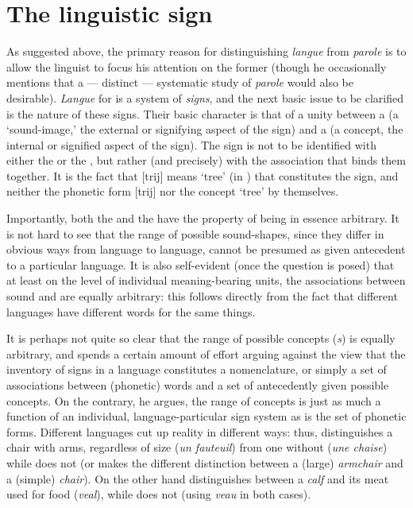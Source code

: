 \section{The linguistic sign}
\label{sec:linguistic-sign}

As suggested above, the primary reason for distinguishing
\emph{langue} from \emph{parole} is to allow the linguist to focus his
attention on the former (though he occasionally mentions that a ---
distinct --- systematic study of \emph{parole} would also be
desirable). \emph{Langue} for {\Saussure} is a system of \emph{signs},
and the next basic issue to be clarified is the nature of these signs.
Their basic character is that of a unity between a \textbf{}
(a `sound-image,' the external or signifying aspect of the sign) and a
\textbf{} (a {concept}, the internal or signified aspect of the
sign).  The sign is not to be identified with either the
\emph{} or the \emph{}, but rather (and precisely)
with the association that binds them together.  It is the fact that
{[trij]} means `tree' (in ) that constitutes the sign, and
neither the phonetic form {[trij]} nor the {concept} `tree' by
themselves.

Importantly, both the \emph{} and the
\emph{} have the property of being in essence arbitrary.
It is not hard to see that the range of possible sound-shapes, since
they differ in obvious ways from language to language, cannot be
presumed as given antecedent to a particular language.  It is also
self-evident (once the question is posed) that at least on the level
of individual meaning-bearing units, the associations between sound
and  are equally arbitrary: this follows directly from the fact
that different languages have different words for the same things.

It is perhaps not quite so clear that the range of possible concepts
(\emph{s}) is equally arbitrary, and {\Saussure} spends a
certain amount of effort arguing against the view that the inventory
of signs in a language constitutes a nomenclature, or simply a set
of associations between (phonetic) words and a set of antecedently
given possible concepts. On the contrary, he argues, the range of
concepts is just as much a function of an individual,
language-particular sign system as is the set of phonetic forms.
Different languages cut up reality in different ways: thus, 
distinguishes a chair with arms, regardless of size (\emph{un
  fauteuil}) from one without (\emph{une chaise}) while 
does not (or makes the different distinction between a (large)
\emph{armchair} and a (simple) \emph{chair}).  On the other
hand  distinguishes between a \emph{calf} and its meat used
for food (\emph{veal}), while  does not (using
\emph{veau} in both cases).

